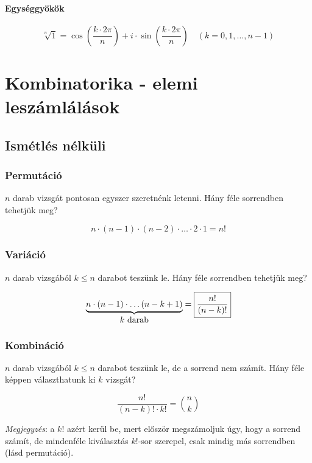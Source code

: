 \documentclass[a4paper,12pt,twoside]{book}
\theoremstyle{break}
\begin{document}
\subsubsection{Egységgyökök}

\[\sqrt[n]{1} = \cos\left(\frac{k\cdot 2\pi}{n}\right)+i\cdot \sin\left(\frac{k\cdot 2\pi}{n}\right) \quad (k = 0, 1, \ldots, n-1)\]








\chapter{Kombinatorika - elemi leszámlálások}

\section{Ismétlés nélküli}

\subsection{Permutáció}

$n$ darab vizsgát pontosan egyszer szeretnénk letenni. Hány féle sorrendben tehetjük meg?

\[n\cdot(n-1)\cdot(n-2)\cdot \ldots \cdot 2\cdot 1 = \boxed{n!} \]

\subsection{Variáció}

$n$ darab vizsgából $k\leqslant n$ darabot teszünk le. Hány féle sorrendben tehetjük meg?

\[\underbrace{n\cdot(n-1)\cdot\ldots(n-k+1)}_{\hbox{$k$ darab}} = \boxed{\frac{n!}{(n-k)!}}\]

\subsection{Kombináció}

$n$ darab vizsgából $k\leqslant n$ darabot teszünk le, de a sorrend nem számít. Hány féle képpen választhatunk ki $k$ vizsgát?

\[\frac{n!}{(n-k)!\cdot k!} = \boxed{\binom{n}{k}}\]

\emph{Megjegyzés}: a $k!$ azért kerül be, mert először megszámoljuk úgy, hogy a sorrend számít, de mindenféle kiválasztás $k!$-sor szerepel, csak mindig más sorrendben (lásd permutáció).
\end{document}
